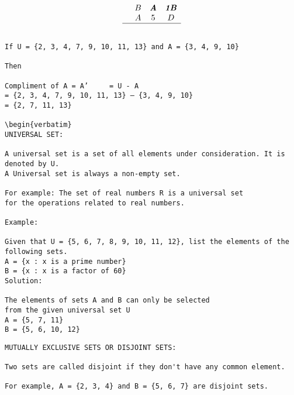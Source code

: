 \documentclass[a4paper,12pt]{article}
\begin{document}
\[\begin{array}{cccc}
	&		&		&		\\	
	&	B	&	\textbf{\emph{A}}	&	\textbf{\emph{1B}}	\\	
	&	A	&	5	&	D	\\	\hline
	&		&		&		\\	
\end{array} \]


\newpage
\begin{verbatim}
If U = {2, 3, 4, 7, 9, 10, 11, 13} and A = {3, 4, 9, 10}

Then

Compliment of A = A’	 = U - A
= {2, 3, 4, 7, 9, 10, 11, 13} – {3, 4, 9, 10}
= {2, 7, 11, 13}

\begin{verbatim}
UNIVERSAL SET: 

A universal set is a set of all elements under consideration. It is denoted by U. 
A Universal set is always a non-empty set.

For example: The set of real numbers R is a universal set
for the operations related to real numbers.

Example: 

Given that U = {5, 6, 7, 8, 9, 10, 11, 12}, list the elements of the following sets. 
A = {x : x is a prime number}
B = {x : x is a factor of 60}
Solution: 

The elements of sets A and B can only be selected 
from the given universal set U 
A = {5, 7, 11}
B = {5, 6, 10, 12}
\end{verbatim}

\newpage
\begin{verbatim}
MUTUALLY EXCLUSIVE SETS OR DISJOINT SETS: 

Two sets are called disjoint if they don't have any common element. 

For example, A = {2, 3, 4} and B = {5, 6, 7} are disjoint sets.

\end{verbatim}
\end{document}
